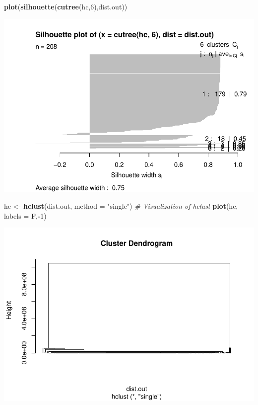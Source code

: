 \documentclass[
]{article}
\newenvironment{Shaded}{\begin{snugshade}}{\end{snugshade}}
\newcommand{\CommentTok}[1]{\textcolor[rgb]{0.56,0.35,0.01}{\textit{#1}}}
\newcommand{\DataTypeTok}[1]{\textcolor[rgb]{0.13,0.29,0.53}{#1}}
\newcommand{\DecValTok}[1]{\textcolor[rgb]{0.00,0.00,0.81}{#1}}
\newcommand{\KeywordTok}[1]{\textcolor[rgb]{0.13,0.29,0.53}{\textbf{#1}}}
\newcommand{\NormalTok}[1]{#1}
\newcommand{\OperatorTok}[1]{\textcolor[rgb]{0.81,0.36,0.00}{\textbf{#1}}}
\newcommand{\StringTok}[1]{\textcolor[rgb]{0.31,0.60,0.02}{#1}}
\begin{document}
\begin{Shaded}
\begin{Highlighting}[]
\KeywordTok{plot}\NormalTok{(}\KeywordTok{silhouette}\NormalTok{(}\KeywordTok{cutree}\NormalTok{(hc,}\DecValTok{6}\NormalTok{),dist.out))}
\end{Highlighting}
\end{Shaded}

\includegraphics{Assignment1_files/figure-latex/unnamed-chunk-26-4.pdf}

\begin{Shaded}
\begin{Highlighting}[]
\NormalTok{hc <-}\StringTok{ }\KeywordTok{hclust}\NormalTok{(dist.out,}
             \DataTypeTok{method =} \StringTok{"single"}\NormalTok{)}
\CommentTok{# Visualization of hclust}
\KeywordTok{plot}\NormalTok{(hc, }\DataTypeTok{labels =}\NormalTok{ F,}\OperatorTok{-}\DecValTok{1}\NormalTok{)}
\end{Highlighting}
\end{Shaded}

\includegraphics{Assignment1_files/figure-latex/unnamed-chunk-26-5.pdf}
\end{document}
